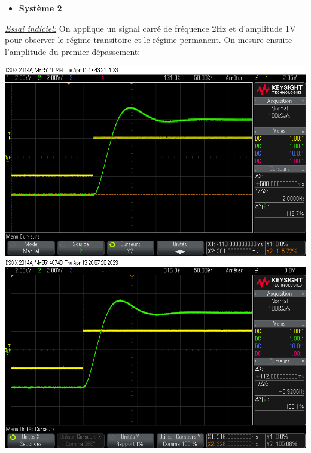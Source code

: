 \documentclass[12pt]{article}
\begin{document}
\begin{itemize}
    \item \bf \large Système 2
\end{itemize}
\underline{\itshape Essai indiciel:} On applique un signal carré de fréquence 2Hz et d'amplitude 1V pour observer le régime transitoire et le régime permanent. On mesure ensuite l'amplitude du premier dépassement: 
\begin{center}
    
    \includegraphics[width = 17cm, height = 11 cm]{TP1/Syst_2/Depassement_syst_2.png}
    \includegraphics[width = 17cm, height = 11 cm]{TP1/Syst_2/13_04_23_tr5prct_2.png}
\end{center}
\end{document}
